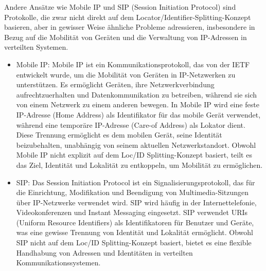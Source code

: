 \documentclass[../vs-script-first-v01.tex]{subfiles}
\begin{document}
Andere Ansätze wie Mobile IP und SIP (Session Initiation Protocol) sind Protokolle, die zwar nicht direkt auf dem Locator/Identifier-Splitting-Konzept basieren, aber in gewisser Weise ähnliche Probleme adressieren, insbesondere in Bezug auf die Mobilität von Geräten und die Verwaltung von IP-Adressen in verteilten Systemen.
\begin{itemize}
\item Mobile IP: Mobile IP ist ein Kommunikationsprotokoll, das von der IETF entwickelt wurde, um die Mobilität von Geräten in IP-Netzwerken zu unterstützen. Es ermöglicht Geräten, ihre Netzwerkverbindung aufrechtzuerhalten und Datenkommunikation zu betreiben, während sie sich von einem Netzwerk zu einem anderen bewegen. In Mobile IP wird eine feste IP-Adresse (Home Address) als Identifikator für das mobile Gerät verwendet, während eine temporäre IP-Adresse (Care-of Address) als Lokator dient. Diese Trennung ermöglicht es dem mobilen Gerät, seine Identität beizubehalten, unabhängig von seinem aktuellen Netzwerkstandort. Obwohl Mobile IP nicht explizit auf dem Loc/ID Splitting-Konzept basiert, teilt es das Ziel, Identität und Lokalität zu entkoppeln, um Mobilität zu ermöglichen. 

\item SIP: Das Session Initiation Protocol ist ein Signalisierungsprotokoll, das für die Einrichtung, Modifikation und Beendigung von Multimedia-Sitzungen über IP-Netzwerke verwendet wird. SIP wird häufig in der Internettelefonie, Videokonferenzen und Instant Messaging eingesetzt. SIP verwendet URIs (Uniform Resource Identifiers) als Identifikatoren für Benutzer und Geräte, was eine gewisse Trennung von Identität und Lokalität ermöglicht. Obwohl SIP nicht auf dem Loc/ID Splitting-Konzept basiert, bietet es eine flexible Handhabung von Adressen und Identitäten in verteilten Kommunikationssystemen.   
\end{itemize} 
\end{document}
